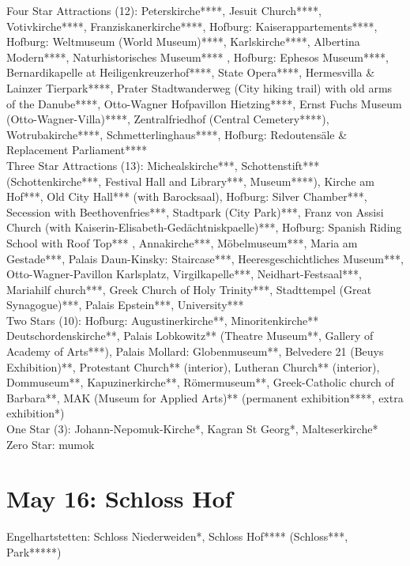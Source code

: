Four Star Attractions (12): Peterskirche****, Jesuit Church****, Votivkirche****, Franziskanerkirche****, Hofburg: Kaiserappartements****, Hofburg: Weltmuseum (World Museum)****, Karlskirche****, Albertina Modern****, Naturhistorisches Museum**** , Hofburg: Ephesos Museum****, Bernardikapelle at Heiligenkreuzerhof****, State Opera****, Hermesvilla \& Lainzer Tierpark****, Prater Stadtwanderweg (City hiking trail) with old arms of the Danube****, Otto-Wagner Hofpavillon Hietzing****, Ernst Fuchs Museum (Otto-Wagner-Villa)****, Zentralfriedhof (Central Cemetery****), Wotrubakirche****, Schmetterlinghaus****, Hofburg: Redoutens\"ale \& Replacement Parliament****\\ 

Three Star Attractions (13):  Michealskirche***, Schottenstift*** (Schottenkirche***, Festival Hall and Library***, Museum****), Kirche am Hof***, Old City Hall*** (with Barocksaal), Hofburg: Silver Chamber***,  Secession with Beethovenfries***, Stadtpark (City Park)***, Franz von Assisi Church (with Kaiserin-Elisabeth-Ged\"achtniskpaelle)***, Hofburg: Spanish Riding School with Roof Top*** , Annakirche***, M\"obelmuseum***, Maria am Gestade***, Palais Daun-Kinsky: Staircase***, Heeresgeschichtliches Museum***, Otto-Wagner-Pavillon Karlsplatz, Virgilkapelle***, Neidhart-Festsaal***, Mariahilf church***, Greek Church of Holy Trinity***, Stadttempel (Great Synagogue)***, Palais Epstein***, University***\\

Two Stars (10): Hofburg: Augustinerkirche**, Minoritenkirche**   Deutschordenskirche**, Palais Lobkowitz** (Theatre Museum**, Gallery of Academy of Arts***), Palais Mollard: Globenmuseum**, Belvedere 21 (Beuys Exhibition)**, Protestant Church** (interior), Lutheran Church** (interior), Dommuseum**, Kapuzinerkirche**, R\"omermuseum**, Greek-Catholic church of Barbara**, MAK (Museum for Applied Arts)** (permanent exhibition****, extra exhibition*)\\

One Star (3): Johann-Nepomuk-Kirche*, Kagran St Georg*, Malteserkirche*\\

Zero Star: mumok

\section{May 16: Schloss Hof}
\label{2021SchlossHof}

Engelhartstetten: Schloss Niederweiden*, Schloss Hof**** (Schloss***, Park*****)


